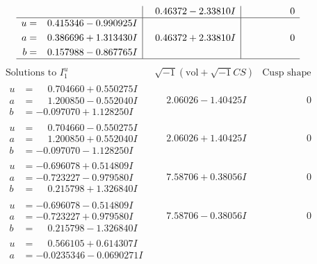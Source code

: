 \documentclass[1p]{elsarticle_modified}
\theoremstyle{definition}
\newcommand{\I}{\sqrt{-1}}
\begin{document}
$$\begin{array}{c|c|c}
 & \phantom{-}0.46372 - 2.33810 I & \phantom{-0.000000 } 0 \\ \hline\begin{aligned}
u &= \phantom{-}0.415346 - 0.990925 I \\
a &= \phantom{-}0.386696 + 1.313430 I \\
b &= \phantom{-}0.157988 - 0.867765 I\end{aligned}
 & \phantom{-}0.46372 + 2.33810 I & \phantom{-0.000000 } 0\\
 \hline 
 \end{array}$$\newpage$$\begin{array}{c|c|c}  
\text{Solutions to }I^u_{1}& \I (\text{vol} + \sqrt{-1}CS) & \text{Cusp shape}\\
 \hline 
\begin{aligned}
u &= \phantom{-}0.704660 + 0.550275 I \\
a &= \phantom{-}1.200850 - 0.552040 I \\
b &= -0.097070 + 1.128250 I\end{aligned}
 & \phantom{-}2.06026 - 1.40425 I & \phantom{-0.000000 } 0 \\ \hline\begin{aligned}
u &= \phantom{-}0.704660 - 0.550275 I \\
a &= \phantom{-}1.200850 + 0.552040 I \\
b &= -0.097070 - 1.128250 I\end{aligned}
 & \phantom{-}2.06026 + 1.40425 I & \phantom{-0.000000 } 0 \\ \hline\begin{aligned}
u &= -0.696078 + 0.514809 I \\
a &= -0.723227 - 0.979580 I \\
b &= \phantom{-}0.215798 + 1.326840 I\end{aligned}
 & \phantom{-}7.58706 + 0.38056 I & \phantom{-0.000000 } 0 \\ \hline\begin{aligned}
u &= -0.696078 - 0.514809 I \\
a &= -0.723227 + 0.979580 I \\
b &= \phantom{-}0.215798 - 1.326840 I\end{aligned}
 & \phantom{-}7.58706 - 0.38056 I & \phantom{-0.000000 } 0 \\ \hline\begin{aligned}
u &= \phantom{-}0.566105 + 0.614307 I \\
a &= -0.0235346 - 0.0690271 I \\

\end{aligned}
\end{array}$$
\end{document}
